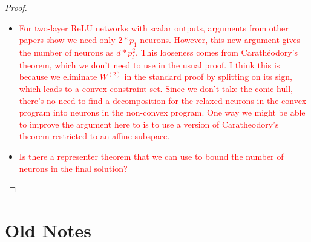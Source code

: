 \documentclass{article}
\begin{document}
\begin{proof}
    \begin{itemize}
        \item
              \textcolor{red}{For two-layer ReLU networks with scalar outputs,
                  arguments from other papers show we need only \( 2 * p_1 \) neurons.
                  However, this new argument gives the number of neurons as \( d * p_{l}^2 \).
                  This looseness comes from Carathéodory's theorem, which
                  we don't need to use in the usual proof.
                  I think this is because we eliminate \( W^{(2)} \)
                  in the standard proof by splitting on its sign, which leads
                  to a convex constraint set.
                  Since we don't take the conic hull, there's no need to find
                  a decomposition for the relaxed neurons in the convex program
                  into neurons in the non-convex program. 
                  One way we might be able to improve the argument here to is to
                  use a version of
                  Caratheodory's theorem restricted to an affine subspace.}
        \item
              \textcolor{red}{Is there a representer theorem that we can use to
                  bound the number of neurons in the final solution?}

    \end{itemize}

\end{proof}

\newpage

\section{Old Notes}
\end{document}
